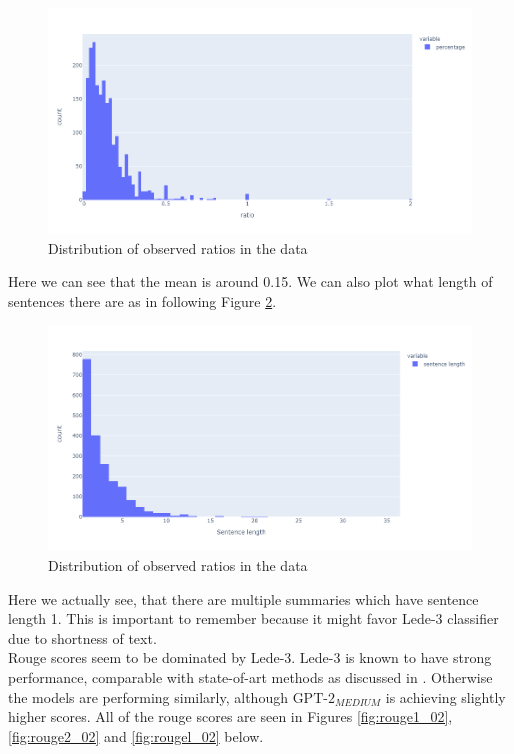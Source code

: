 \documentclass{article}
\newcommand{\gptmedium}{$\text{GPT-2}_{MEDIUM}$ }
\begin{document}
\noindent
\begin{figure}[h!]
	\centering
	\hspace*{-3cm}
	\includegraphics[scale=0.55]{empirical_ratio.png}
	\caption{Distribution of observed ratios in the data}
	\label{fig:empirical_ratio}
\end{figure}

\noindent
Here we can see that the mean is around 0.15. We can also plot what length of sentences there are as in following Figure \ref{fig:empirical_lengths}.

\noindent
\begin{figure}[h]
	\centering
	\hspace*{-3cm}
	\includegraphics[scale=0.55]{empirical_lengths.png}
	\caption{Distribution of observed ratios in the data}
	\label{fig:empirical_lengths}
\end{figure}

\noindent
Here we actually see, that there are multiple summaries which have sentence length 1. This is important to remember because it might favor Lede-3 classifier due to shortness of text.\\

\noindent
Rouge scores seem to be dominated by Lede-3. Lede-3 is known to have strong performance, comparable with state-of-art methods as discussed in \cite{dataset}. Otherwise the models are performing similarly, although \gptmedium is achieving slightly higher scores. All of the rouge scores are seen in Figures \ref{fig:rouge1_02}, \ref{fig:rouge2_02} and \ref{fig:rougel_02} below. 
\end{document}
